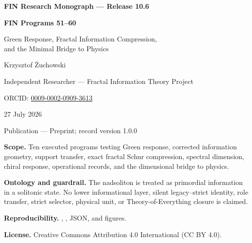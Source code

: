 \documentclass[11pt,a4paper,openany]{report}
\begin{document}
\hypersetup{pageanchor=false}
\begin{titlepage}
\centering
\vspace*{9mm}
{\Large\bfseries FIN Research Monograph --- Release 10.6\par}
\vspace{11mm}
{\Huge\bfseries FIN Programs 51--60\par}
\vspace{6mm}
{\Large Green Response, Fractal Information Compression,\\and the Minimal Bridge to Physics\par}
\vspace{17mm}
{\Large Krzysztof \.Zuchowski\par}
\vspace{2mm}
{\normalsize Independent Researcher --- Fractal Information Theory Project\par}
\vspace{2mm}
{\normalsize ORCID: \href{https://orcid.org/0009-0002-0909-3613}{0009-0002-0909-3613}\par}
\vspace{10mm}
{\large 27 July 2026\par}
{\normalsize Publication --- Preprint; record version 1.0.0\par}
\vfill
\begin{minipage}{0.88\textwidth}
\small
\textbf{Scope.} Ten executed programs testing Green response, corrected
information geometry, support transfer, exact fractal Schur compression,
spectral dimension, chiral response, operational records, and the dimensional
bridge to physics.

\medskip
\textbf{Ontology and guardrail.} The nadsoliton is treated as primordial
information in a solitonic state. No lower informational layer, silent
legacy--strict identity, role transfer, strict selector, physical unit, or
Theory-of-Everything closure is claimed.

\medskip
\textbf{Reproducibility.}
,
, JSON, and figures.

\medskip
\textbf{License.} Creative Commons Attribution 4.0 International (CC BY 4.0).
\end{minipage}
\vfill
\end{titlepage}
\hypersetup{pageanchor=true}

\tableofcontents
\clearpage
{}
\end{document}
